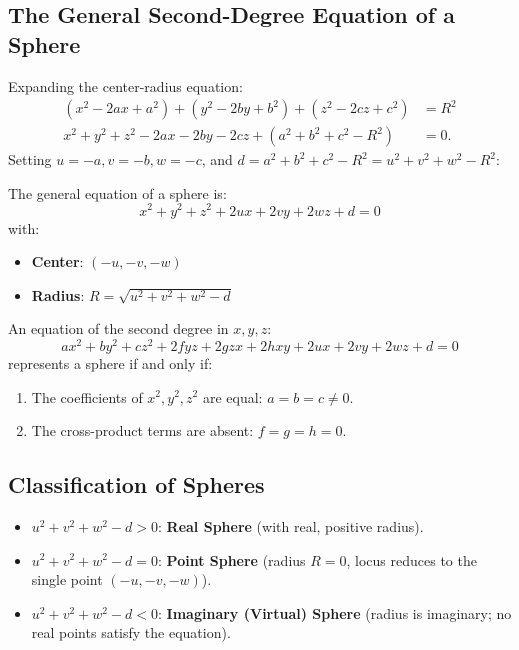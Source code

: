 \subsection{The General Second-Degree Equation of a Sphere}
Expanding the center-radius equation:
\begin{align}
    (x^2 - 2ax + a^2) + (y^2 - 2by + b^2) + (z^2 - 2cz + c^2) &= R^2 \nonumber\\
    x^2 + y^2 + z^2 - 2ax - 2by - 2cz + (a^2 + b^2 + c^2 - R^2) &= 0.
\end{align}
Setting $u = -a, v = -b, w = -c$, and $d = a^2 + b^2 + c^2 - R^2 = u^2 + v^2 + w^2 - R^2$:

\begin{theorembox}
The general equation of a sphere is:
\begin{equation}
    \boxed{x^2 + y^2 + z^2 + 2ux + 2vy + 2wz + d = 0}
\end{equation}
with:
\begin{itemize}[noitemsep]
    \item \textbf{Center}: $(-u, -v, -w)$
    \item \textbf{Radius}: $R = \sqrt{u^2 + v^2 + w^2 - d}$
\end{itemize}
\end{theorembox}

\begin{notebox}
An equation of the second degree in $x, y, z$:
\begin{equation}
    ax^2 + by^2 + cz^2 + 2fyz + 2gzx + 2hxy + 2ux + 2vy + 2wz + d = 0
\end{equation}
represents a sphere if and only if:
\begin{enumerate}[noitemsep]
    \item The coefficients of $x^2, y^2, z^2$ are equal: $a = b = c \neq 0$.
    \item The cross-product terms are absent: $f = g = h = 0$.
\end{enumerate}
\end{notebox}

\subsection{Classification of Spheres}
\begin{itemize}[noitemsep]
    \item $u^2 + v^2 + w^2 - d > 0$: \textbf{Real Sphere} (with real, positive radius).
    \item $u^2 + v^2 + w^2 - d = 0$: \textbf{Point Sphere} (radius $R = 0$, locus reduces to the single point $(-u, -v, -w)$).
    \item $u^2 + v^2 + w^2 - d < 0$: \textbf{Imaginary (Virtual) Sphere} (radius is imaginary; no real points satisfy the equation).
\end{itemize}

